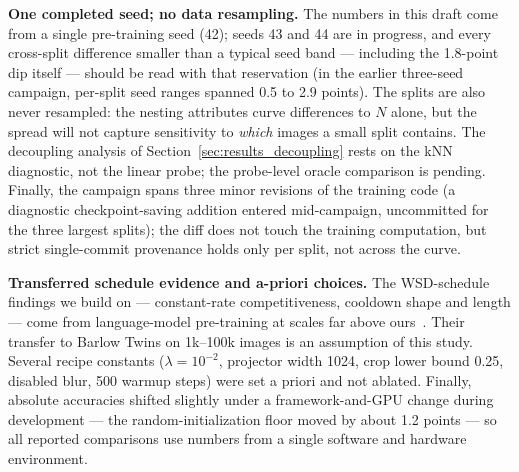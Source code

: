 \textbf{One completed seed; no data resampling.} The numbers in this draft
come from a single pre-training seed (42); seeds 43 and 44 are in progress,
and every cross-split difference smaller than a typical seed band ---
including the 1.8-point dip itself --- should be read with that reservation
(in the earlier three-seed campaign, per-split seed ranges spanned 0.5 to
2.9 points). The splits are also never resampled: the nesting attributes
curve differences to $N$ alone, but the spread will not capture sensitivity
to \emph{which} images a small split contains. The decoupling analysis of
Section~\ref{sec:results_decoupling} rests on the kNN diagnostic, not the
linear probe; the probe-level oracle comparison is pending. Finally, the
campaign spans three minor revisions of the training code (a diagnostic
checkpoint-saving addition entered mid-campaign, uncommitted for the three
largest splits); the diff does not touch the training computation, but
strict single-commit provenance holds only per split, not across the
curve.

\textbf{Transferred schedule evidence and a-priori choices.} The
WSD-schedule findings we build on --- constant-rate competitiveness,
cooldown shape and length --- come from language-model pre-training at
scales far above ours~\cite{hagele2024scaling,hu2024minicpm}. Their transfer
to Barlow Twins on 1k--100k images is an assumption of this study. Several
recipe constants ($\lambda = 10^{-2}$, projector width 1024, crop lower
bound 0.25, disabled blur, 500 warmup steps) were set a priori and not
ablated. Finally, absolute
accuracies shifted slightly under a framework-and-GPU change during
development --- the random-initialization floor moved by about 1.2 points
--- so all reported comparisons use numbers from a single software and
hardware environment.

